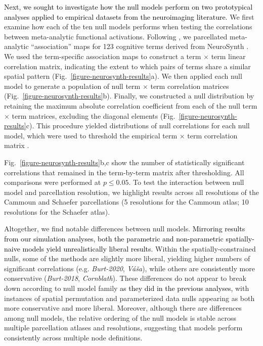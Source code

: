 \documentclass[12pt,aps,pra,reprint,showkeys]{revtex4-1}
\newcommand{\nimg}[1]{\textcolor{black}{{#1}}}
\begin{document}
\nimg{Next, we sought to investigate how the null models perform on two prototypical analyses applied to empirical datasets from the neuroimaging literature.}
We first examine how each of the ten null models performs when testing the correlations between meta-analytic functional activations.
Following \citet{alexanderbloch2018neuroimage}, we parcellated meta-analytic ``association'' maps for 123 cognitive terms derived from NeuroSynth \citep{yarkoni2011natmethods, poldrack2011frontiers}.
We used the term-specific association maps to construct a term $\times$ term linear correlation matrix, indicating the extent to which pairs of terms share a similar spatial pattern (Fig.~\ref{figure-neurosynth-results}a).
We then applied each null model to generate a population of null term $\times$ term correlation matrices (Fig.~\ref{figure-neurosynth-results}b).
Finally, we constructed a null distribution by retaining the maximum absolute correlation coefficient from each of the null term $\times$ term matrices, excluding the diagonal elements (Fig.~\ref{figure-neurosynth-results}c).
This procedure yielded distributions of null correlations for each null model, which were used to threshold the empirical term $\times$ term correlation matrix \citep{alexanderbloch2018neuroimage}.

Fig.~\ref{figure-neurosynth-results}b,c show the number of statistically significant correlations that remained in the term-by-term matrix after thresholding.
All comparisons were performed at $p \leq 0.05$.
To test the interaction between null model and parcellation resolution, we highlight results across all resolutions of the Cammoun and Schaefer parcellations (5 resolutions for the Cammoun atlas; 10 resolutions for the Schaefer atlas).

Altogether, we find notable differences between null models.
\nimg{Mirroring results from our simulation analyses, both the parametric and non-parametric spatially-naive models yield unrealistically liberal results.}
Within the spatially-constrained nulls, some of the methods are slightly more liberal, yielding higher numbers of significant correlations (e.g. \textit{Burt-2020}, \textit{V\'a\v{s}a}), while others are consistently more conservative (\textit{Burt-2018}, \textit{Cornblath}).
These differences do not appear to break down according to null model family \nimg{as they did in the previous analyses,} with instances of spatial permutation and parameterized data nulls appearing as both more conservative and more liberal.
Moreover, although there are differences among null models, the relative ordering of the null models is stable across multiple parcellation atlases and resolutions, suggesting that models perform consistently across multiple node definitions.
\end{document}
